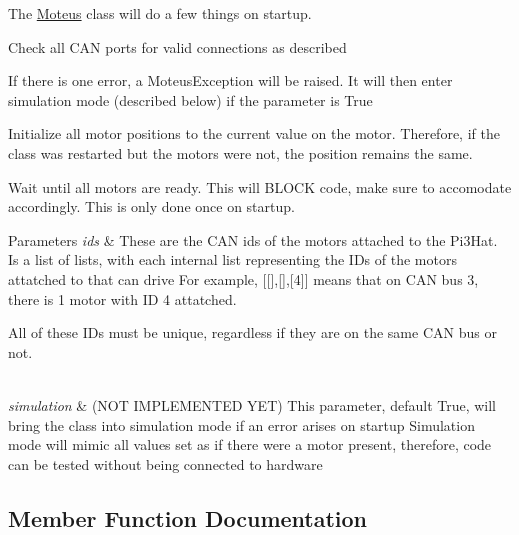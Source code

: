 The \hyperlink{classMoteus_1_1Moteus}{Moteus} class will do a few things on startup.
\begin{DoxyItemize}
\item Check all C\+AN ports for valid connections as described
\begin{DoxyItemize}
\item If there is one error, a Moteus\+Exception will be raised. It will then enter simulation mode (described below) if the parameter is True
\end{DoxyItemize}
\item Initialize all motor positions to the current value on the motor. Therefore, if the class was restarted but the motors were not, the position remains the same.
\item Wait until all motors are ready. This will B\+L\+O\+CK code, make sure to accomodate accordingly. This is only done once on startup. 
\begin{DoxyParams}{Parameters}
{\em ids} & These are the C\+AN ids of the motors attached to the Pi3\+Hat. Is a list of lists, with each internal list representing the I\+Ds of the motors attatched to that can drive For example, \mbox{[}\mbox{[}\mbox{]},\mbox{[}\mbox{]},\mbox{[}4\mbox{]}\mbox{]} means that on C\+AN bus 3, there is 1 motor with ID 4 attatched.
\begin{DoxyItemize}
\item All of these I\+Ds must be unique, regardless if they are on the same C\+AN bus or not. 
\end{DoxyItemize}\\
\hline
{\em simulation} & (N\+OT I\+M\+P\+L\+E\+M\+E\+N\+T\+ED Y\+ET) This parameter, default True, will bring the class into simulation mode if an error arises on startup Simulation mode will mimic all values set as if there were a motor present, therefore, code can be tested without being connected to hardware \\
\hline
\end{DoxyParams}

\end{DoxyItemize}

\subsection{Member Function Documentation}
\mbox{\label{classMoteus_1_1Moteus_a2e5bafddee5cfb9833f14ebf5e12f354}} 
